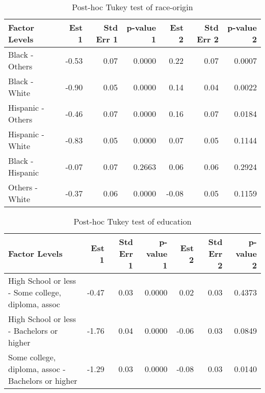 \documentclass[11pt]{extarticle} %
\begin{document}
\begin{table}[ht]
\footnotesize
\centering
\begin{tabular}{lrrrrrr}
  \hline
Factor Levels & Est 1 & Std Err 1 & p-value 1 & Est 2 & Std Err 2 & p-value 2 \\ 
  \hline
 Black - Others & -0.53 & 0.07 & 0.0000 & 0.22 & 0.07 & 0.0007 \\ 
   Black - White & -0.90 & 0.05 & 0.0000 & 0.14 & 0.04 & 0.0022 \\ 
   Hispanic - Others & -0.46 & 0.07 & 0.0000 & 0.16 & 0.07 & 0.0184 \\ 
   Hispanic - White & -0.83 & 0.05 & 0.0000 & 0.07 & 0.05 & 0.1144 \\ 
   Black - Hispanic & -0.07 & 0.07 & 0.2663 & 0.06 & 0.06 & 0.2924 \\ 
   Others - White & -0.37 & 0.06 & 0.0000 & -0.08 & 0.05 & 0.1159 \\ 
   \hline
\end{tabular}
\caption{Post-hoc Tukey test of race-origin} 
\label{tab:Table4RaceOrigin}
\end{table}

\begin{table}[ht]
\footnotesize
\centering
\begin{tabular}{lrrrrrr}
  \hline
Factor Levels & Est 1 & Std Err 1 & p-value 1 & Est 2 & Std Err 2 & p-value 2 \\ 
  \hline
 High School or less - Some college, diploma, assoc & -0.47 & 0.03 & 0.0000 & 0.02 & 0.03 & 0.4373 \\ 
   High School or less - Bachelors or higher & -1.76 & 0.04 & 0.0000 & -0.06 & 0.03 & 0.0849 \\ 
   Some college, diploma, assoc - Bachelors or higher & -1.29 & 0.03 & 0.0000 & -0.08 & 0.03 & 0.0140 \\ 
   \hline
\end{tabular}
\caption{Post-hoc Tukey test of education} 
\label{tab:Table5Education}
\end{table}
\end{document}
